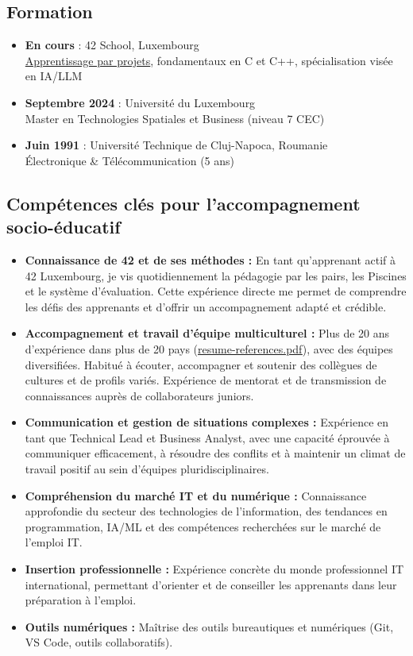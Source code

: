 \documentclass[a4paper,10pt]{article}
\begin{document}
\subsection*{Formation}
\begin{itemize}
    \item \textbf{En cours} : 42 School, Luxembourg\\
    \href{gotoe:embedded=references/42Transcript.pdf}{Apprentissage par projets}, fondamentaux en C et C++, spécialisation visée en IA/LLM
    \item \textbf{Septembre 2024} : Université du Luxembourg\\
    Master en Technologies Spatiales et Business (niveau 7 CEC)
    \item \textbf{Juin 1991} : Université Technique de Cluj-Napoca, Roumanie\\
    Électronique \& Télécommunication (5 ans)
\end{itemize}

\subsection*{Compétences clés pour l'accompagnement socio-éducatif}
\begin{itemize}
    \item \textbf{Connaissance de 42 et de ses méthodes :} En tant qu'apprenant actif à 42 Luxembourg, je vis quotidiennement la pédagogie par les pairs, les Piscines et le système d'évaluation. Cette expérience directe me permet de comprendre les défis des apprenants et d'offrir un accompagnement adapté et crédible.
    \item \textbf{Accompagnement et travail d'équipe multiculturel :} Plus de 20 ans d'expérience dans plus de 20 pays
    (\href{gotoe:embedded=references/resume-references.pdf}{resume-references.pdf}),
    avec des équipes diversifiées. Habitué à écouter, accompagner et soutenir des collègues de cultures et de profils variés. Expérience de mentorat et de transmission de connaissances auprès de collaborateurs juniors.
    \item \textbf{Communication et gestion de situations complexes :} Expérience en tant que Technical Lead et Business Analyst, avec une capacité éprouvée à communiquer efficacement, à résoudre des conflits et à maintenir un climat de travail positif au sein d'équipes pluridisciplinaires.
    \item \textbf{Compréhension du marché IT et du numérique :} Connaissance approfondie du secteur des technologies de l'information, des tendances en programmation, IA/ML et des compétences recherchées sur le marché de l'emploi IT.
    \item \textbf{Insertion professionnelle :} Expérience concrète du monde professionnel IT international, permettant d'orienter et de conseiller les apprenants dans leur préparation à l'emploi.
    \item \textbf{Outils numériques :} Maîtrise des outils bureautiques et numériques (Git, VS Code, outils collaboratifs).
\end{itemize}
\end{document}
